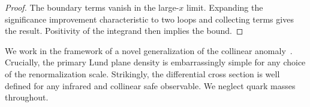 \begin{proof}
The boundary terms vanish in the large-$x$ limit. Expanding the
significance improvement characteristic to two loops and collecting
terms gives the result. Positivity of the integrand then implies the
bound.
\end{proof}

We work in the framework of a novel generalization of the collinear
anomaly~\cite{TPC:1419-Towards-Zero-Bin-Subtracted-Lund-Plane-Emissions-for-Precision-QCD-October-1-2026}.
Crucially, the primary Lund plane density is embarrassingly simple for
any choice of the renormalization scale. Strikingly, the differential
cross section is well defined for any infrared and collinear safe
observable. We neglect quark masses throughout.

